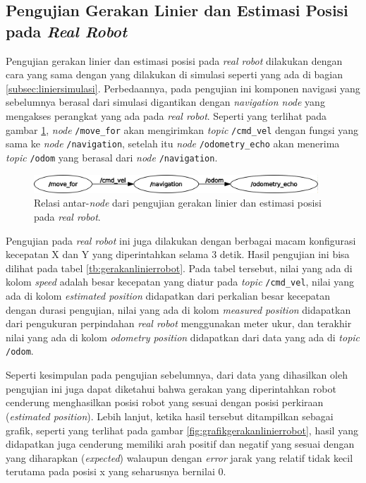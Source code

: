 \subsection{Pengujian Gerakan Linier dan Estimasi Posisi pada \emph{Real Robot}}
\label{subsec:linierrobot}

Pengujian gerakan linier dan estimasi posisi pada \emph{real robot} dilakukan dengan cara yang sama dengan yang dilakukan di simulasi seperti yang ada di bagian \ref{subsec:liniersimulasi}.
Perbedaannya, pada pengujian ini komponen navigasi yang sebelumnya berasal dari simulasi digantikan dengan \emph{navigation node} yang mengakses perangkat yang ada pada \emph{real robot}.
Seperti yang terlihat pada gambar \ref{fig:rosgraphnavigation},
  \emph{node} \lstinline{/move_for} akan mengirimkan \emph{topic} \lstinline{/cmd_vel} dengan fungsi yang sama ke \emph{node} \lstinline{/navigation},
  setelah itu \emph{node} \lstinline{/odometry_echo} akan menerima \emph{topic} \lstinline{/odom} yang berasal dari \emph{node} \lstinline{/navigation}.

\begin{figure}[ht]
  \centering
  \includegraphics[width=0.95\textwidth,keepaspectratio]{gambar/rosgraph-navigation.png}
  \caption{Relasi antar-\emph{node} dari pengujian gerakan linier dan estimasi posisi pada \emph{real robot}.}
  \label{fig:rosgraphnavigation}
\end{figure}

Pengujian pada \emph{real robot} ini juga dilakukan dengan berbagai macam konfigurasi kecepatan X dan Y yang diperintahkan selama 3 detik.
Hasil pengujian ini bisa dilihat pada tabel \ref{tb:gerakanlinierrobot}.
Pada tabel tersebut, nilai yang ada di kolom \emph{speed} adalah besar kecepatan yang diatur pada \emph{topic} \lstinline{/cmd_vel},
  nilai yang ada di kolom \emph{estimated position} didapatkan dari perkalian besar kecepatan dengan durasi pengujian,
  nilai yang ada di kolom \emph{measured position} didapatkan dari pengukuran perpindahan \emph{real robot} menggunakan meter ukur,
  dan terakhir nilai yang ada di kolom \emph{odometry position} didapatkan dari data yang ada di \emph{topic} \lstinline{/odom}.



Seperti kesimpulan pada pengujian sebelumnya,
  dari data yang dihasilkan oleh pengujian ini juga dapat diketahui bahwa gerakan yang diperintahkan robot cenderung menghasilkan posisi robot yang sesuai dengan posisi perkiraan (\emph{estimated position}).
Lebih lanjut, ketika hasil tersebut ditampilkan sebagai grafik,
  seperti yang terlihat pada gambar \ref{fig:grafikgerakanlinierrobot},
  hasil yang didapatkan juga cenderung memiliki arah positif dan negatif yang sesuai dengan yang diharapkan (\emph{expected}) walaupun dengan \emph{error} jarak yang relatif tidak kecil terutama pada posisi x yang seharusnya bernilai 0.


